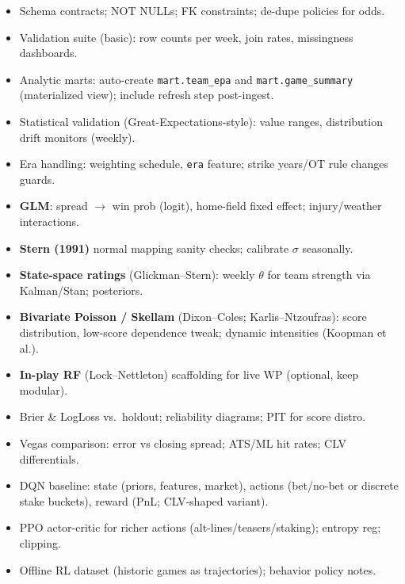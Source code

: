 \begin{itemize}
  \item {} Schema contracts; NOT NULLs; FK constraints; de-dupe policies for odds.
  \item {} Validation suite (basic): row counts per week, join rates, missingness dashboards.
  \item {} Analytic marts: auto-create \texttt{mart.team\_epa} and \texttt{mart.game\_summary} (materialized view); include refresh step post-ingest. \done
  \item {} Statistical validation (Great-Expectations-style): value ranges, distribution drift monitors (weekly).
  \item {} Era handling: weighting schedule, \texttt{era} feature; strike years/OT rule changes guards.
\end{itemize}

\begin{itemize}
  \item {} \textbf{GLM}: spread $\to$ win prob (logit), home-field fixed effect; injury/weather interactions.
  \item {} \textbf{Stern (1991)} normal mapping sanity checks; calibrate $\sigma$ seasonally.
  \item {} \textbf{State-space ratings} (Glickman--Stern): weekly $\theta$ for team strength via Kalman/Stan; posteriors.
  \item {} \textbf{Bivariate Poisson / Skellam} (Dixon--Coles; Karlis--Ntzoufras): score distribution, low-score dependence tweak; dynamic intensities (Koopman et al.).
  \item {} \textbf{In-play RF} (Lock--Nettleton) scaffolding for live WP (optional, keep modular).
\end{itemize}

\begin{itemize}
  \item {} Brier \& LogLoss vs.\ holdout; reliability diagrams; PIT for score distro.
  \item {} Vegas comparison: error vs closing spread; ATS/ML hit rates; CLV differentials.
\end{itemize}

\begin{itemize}
  \item {} DQN baseline: state (priors, features, market), actions (bet/no-bet or discrete stake buckets), reward (PnL; CLV-shaped variant).
  \item {} PPO actor-critic for richer actions (alt-lines/teasers/staking); entropy reg; clipping.
  \item {} Offline RL dataset (historic games as trajectories); behavior policy notes.
\end{itemize}

